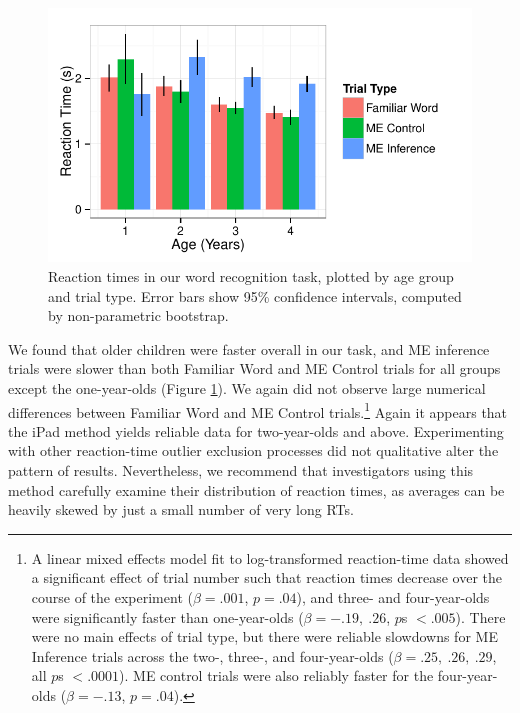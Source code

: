 \documentclass[man,noapacite]{apa2}
\begin{document}
\begin{figure}[t] 
  \begin{center} 
    \includegraphics[width=5in]{figures/rt.pdf} 
    \caption{\label{fig:rt} Reaction times in our word recognition task, plotted by age group and trial type. Error bars show 95\% confidence intervals, computed by non-parametric bootstrap.}
  \end{center} 
\end{figure}

We found that older children were faster overall in our task, and ME inference trials were slower than both Familiar Word and ME Control trials for all groups except the one-year-olds (Figure \ref{fig:rt}). We again did not observe large numerical differences between Familiar Word and ME Control trials.\footnote{A linear mixed effects model fit to log-transformed reaction-time data showed a significant effect of trial number such that reaction times decrease over the course of the experiment ($\beta = .001$, $p = .04$), and three- and four-year-olds were significantly faster than one-year-olds ($\beta = -.19,~.26$, $p$s $<.005$). There were no main effects of trial type, but there were reliable slowdowns for ME Inference trials across the two-, three-, and four-year-olds ($\beta=.25,~.26,~.29$, all $p$s $< .0001$). ME control trials were also reliably faster for the four-year-olds ($\beta=-.13$, $p=.04$).} Again it appears that the iPad method yields reliable data for two-year-olds and above. Experimenting with other reaction-time outlier exclusion processes did not qualitative alter the pattern of results. Nevertheless, we recommend that investigators using this method carefully examine their distribution of reaction times, as averages can be heavily skewed by just a small number of very long RTs.
\end{document}
